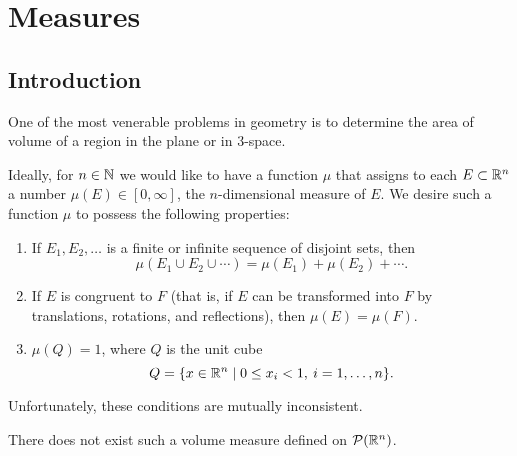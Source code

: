 \chapter{Measures}\label{chap:measures}
\section{Introduction}
One of the most venerable problems in geometry is to determine the area of volume of a region in the plane or in 3-space.

Ideally, for $n\in\mathbb N$ we would like to have a function $\mu$ that assigns to each $E\subset\mathbb R^n$ a number $\mu(E)\in[0,\infty]$, the $n$-dimensional measure of $E$.
We desire such a function $\mu$ to possess the following properties:
\begin{enumerate}
\item If $E_1,E_2,\dots$ is a finite or infinite sequence of disjoint sets, then
\[\mu(E_1\cup E_2\cup\cdots)=\mu(E_1)+\mu(E_2)+\cdots.\]
\item If $E$ is congruent to $F$ (that is, if $E$ can be transformed into $F$ by translations, rotations, and reflections), then $\mu(E)=\mu(F)$.
\item $\mu(Q)=1$, where $Q$ is the unit cube
\[Q=\{x\in\mathbb R^n\mid 0\le x_i<1,\:i=1,\dots,n\}.\]
\end{enumerate}

Unfortunately, these conditions are mutually inconsistent.

\begin{proposition}
There does not exist such a volume measure defined on $\mathcal{P}(\mathbb R^n)$.
\end{proposition}


